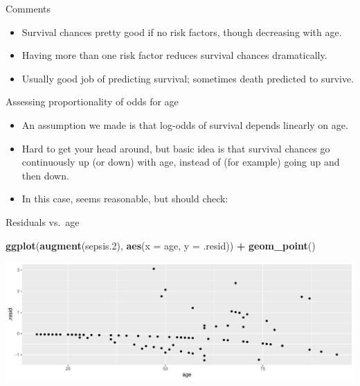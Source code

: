 \documentclass[
  ignorenonframetext,
]{beamer}
\newenvironment{Shaded}{\begin{snugshade}}{\end{snugshade}}
\newcommand{\DataTypeTok}[1]{\textcolor[rgb]{0.13,0.29,0.53}{#1}}
\newcommand{\FloatTok}[1]{\textcolor[rgb]{0.00,0.00,0.81}{#1}}
\newcommand{\KeywordTok}[1]{\textcolor[rgb]{0.13,0.29,0.53}{\textbf{#1}}}
\newcommand{\NormalTok}[1]{#1}
\newcommand{\OperatorTok}[1]{\textcolor[rgb]{0.81,0.36,0.00}{\textbf{#1}}}
\newcommand{\StringTok}[1]{\textcolor[rgb]{0.31,0.60,0.02}{#1}}
\begin{document}
\begin{frame}{Comments}
\protect\hypertarget{comments-13}{}

\begin{itemize}
\item
  Survival chances pretty good if no risk factors, though decreasing
  with age.
\item
  Having more than one risk factor reduces survival chances
  dramatically.
\item
  Usually good job of predicting survival; sometimes death predicted to
  survive.
\end{itemize}

\end{frame}

\begin{frame}{Assessing proportionality of odds for age}
\protect\hypertarget{assessing-proportionality-of-odds-for-age}{}

\begin{itemize}
\item
  An assumption we made is that log-odds of survival depends linearly on
  age.
\item
  Hard to get your head around, but basic idea is that survival chances
  go continuously up (or down) with age, instead of (for example) going
  up and then down.
\item
  In this case, seems reasonable, but should check:
\end{itemize}

\end{frame}

\begin{frame}[fragile]{Residuals vs.~age}
\protect\hypertarget{residuals-vs.-age}{}

\begin{Shaded}
\begin{Highlighting}[]
\KeywordTok{ggplot}\NormalTok{(}\KeywordTok{augment}\NormalTok{(sepsis}\FloatTok{.2}\NormalTok{), }\KeywordTok{aes}\NormalTok{(}\DataTypeTok{x =}\NormalTok{ age, }\DataTypeTok{y =}\NormalTok{ .resid)) }\OperatorTok{+}
\StringTok{  }\KeywordTok{geom_point}\NormalTok{()}
\end{Highlighting}
\end{Shaded}

\includegraphics{slides_d29_files/figure-beamer/virtusentella-1.pdf}

\end{frame}
\end{document}
